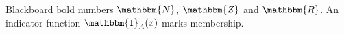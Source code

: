 \documentclass{article}
\begin{document}
Blackboard bold numbers $\mathbbm{N}$, $\mathbbm{Z}$ and $\mathbbm{R}$.
An indicator function $\mathbbm{1}_{A}(x)$ marks membership.
\end{document}
